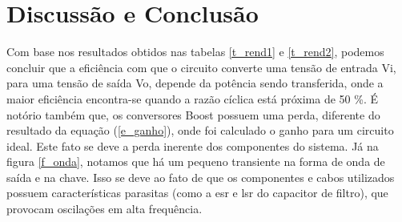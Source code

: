 \newpage
\section{Discussão e Conclusão}
Com base nos resultados obtidos nas tabelas \ref{t_rend1} e \ref{t_rend2}, podemos concluir que a eficiência com que o circuito converte uma tensão de entrada Vi, para uma tensão de saída Vo, depende da potência sendo transferida, onde a maior eficiência encontra-se quando a razão cíclica está próxima de 50 \%. É notório também que, os conversores Boost possuem uma perda, diferente do resultado da equação (\ref{e_ganho}), onde foi calculado o ganho para um circuito ideal. Este fato se deve a perda inerente dos componentes do sistema.
Já na figura \ref{f_onda}, notamos que há um pequeno transiente na forma de onda de saída e na chave. Isso se deve ao fato de que os componentes e cabos utilizados possuem características parasitas (como a esr e lsr do capacitor de filtro), que provocam oscilações em alta frequência.